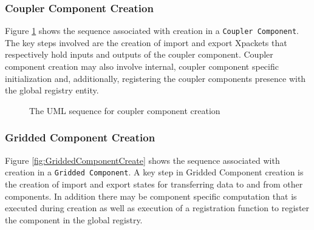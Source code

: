 \subsubsection{Coupler Component Creation}
Figure \ref{fig:CouplerComponentCreate} shows the sequence associated
with creation in a {\tt Coupler Component}. The key steps involved are
the creation of import and export Xpackets that respectively hold inputs and
outputs of the coupler component. Coupler component creation may also involve
internal, coupler component specific initialization and, additionally,
registering the coupler components presence with the global registry entity.

\begin{figure}
\caption[{Coupler Component Create}]
{The UML sequence for coupler component creation}
\begin{center}
\label{fig:CouplerComponentCreate}
\end{center}
\end{figure}

\subsubsection{Gridded Component Creation}
Figure \ref{fig:GriddedComponentCreate} shows the sequence associated with
creation in a {\tt Gridded Component}. A key step in Gridded Component
creation is the creation of import and export states for transferring 
data to and from other components. In addition there may be component
specific computation that is executed during creation as well as execution
of a registration function to register the component in the global registry.

